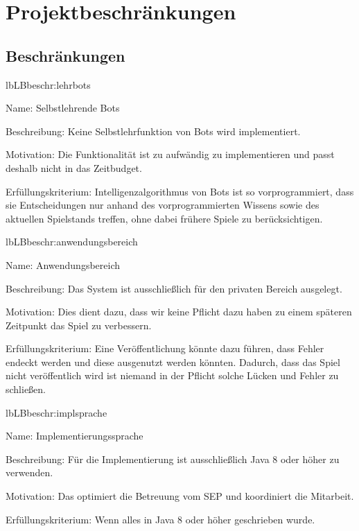 \chapter{Projektbeschränkungen}

\section{Beschränkungen}

\setcounter{lb}{10}

\begin{description}[leftmargin=5em, style=sameline]
	
	\begin{lhp}{lb}{LB}{beschr:lehrbots}
		\item [Name:] Selbstlehrende Bots
		\item [Beschreibung:] Keine Selbstlehrfunktion von Bots wird implementiert.
		\item [Motivation:] Die Funktionalität ist zu aufwändig zu implementieren und passt deshalb nicht in das Zeitbudget.
		\item [Erfüllungskriterium:] Intelligenzalgorithmus von Bots ist so vorprogrammiert, dass sie Entscheidungen nur anhand des vorprogrammierten Wissens sowie des aktuellen Spielstands treffen, ohne dabei frühere Spiele zu berücksichtigen.
	\end{lhp}
	
	\begin{lhp}{lb}{LB}{beschr:anwendungsbereich}
		\item [Name:] Anwendungsbereich
		\item [Beschreibung:] Das System ist ausschließlich für den privaten Bereich ausgelegt.
		\item [Motivation:] Dies dient dazu, dass wir keine Pflicht dazu haben zu einem späteren Zeitpunkt das Spiel zu verbessern.
		\item [Erfüllungskriterium:] Eine Veröffentlichung könnte dazu führen, dass Fehler endeckt werden und diese ausgenutzt werden könnten. Dadurch, dass das Spiel nicht veröffentlich wird ist niemand in der Pflicht solche Lücken und Fehler zu schließen. 
	\end{lhp}
	
		
	\begin{lhp}{lb}{LB}{beschr:implsprache}
		\item [Name:] Implementierungssprache
		\item [Beschreibung:] Für die Implementierung ist ausschließlich Java 8 oder höher zu verwenden.
		\item [Motivation:] Das optimiert die Betreuung vom SEP und koordiniert die Mitarbeit.
		\item [Erfüllungskriterium:] Wenn alles in Java 8 oder höher geschrieben wurde.
	\end{lhp}
	

\end{description}
